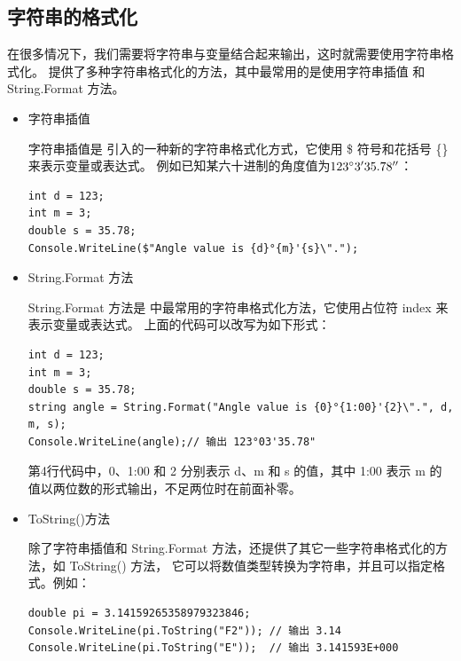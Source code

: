 \subsection{字符串的格式化}

在很多情况下，我们需要将字符串与变量结合起来输出，这时就需要使用字符串格式化。
\cs 提供了多种字符串格式化的方法，其中最常用的是使用字符串插值 和 String.Format 方法。

\begin{itemize}
    \item 字符串插值

          字符串插值是  引入的一种新的字符串格式化方式，它使用 \$ 符号和花括号 \{\} 来表示变量或表达式。
          例如已知某六十进制的角度值为$123^\circ3'35.78''$：

          \begin{lstlisting}
int d = 123;
int m = 3;
double s = 35.78;
Console.WriteLine($"Angle value is {d}°{m}'{s}\".");
\end{lstlisting}

    \item String.Format 方法

          String.Format 方法是 \cs 中最常用的字符串格式化方法，它使用占位符 {index} 来表示变量或表达式。
          上面的代码可以改写为如下形式：

          \begin{lstlisting}
int d = 123;
int m = 3;
double s = 35.78;
string angle = String.Format("Angle value is {0}°{1:00}'{2}\".", d, m, s);
Console.WriteLine(angle);// 输出 123°03'35.78"
\end{lstlisting}

          第4行代码中，{0}、{1:00} 和 {2} 分别表示 d、m 和 s 的值，其中 {1:00} 表示 m 的值以两位数的形式输出，不足两位时在前面补零。

    \item ToString()方法

          除了字符串插值和 String.Format 方法，\cs 还提供了其它一些字符串格式化的方法，如 ToString() 方法，
          它可以将数值类型转换为字符串，并且可以指定格式。例如：

          \begin{lstlisting}
double pi = 3.14159265358979323846;
Console.WriteLine(pi.ToString("F2")); // 输出 3.14
Console.WriteLine(pi.ToString("E"));  // 输出 3.141593E+000
\end{lstlisting}

\end{itemize}


